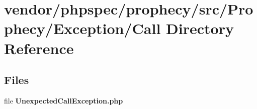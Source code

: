 \section{vendor/phpspec/prophecy/src/\+Prophecy/\+Exception/\+Call Directory Reference}
\label{dir_31c338fbad1d6237b747d48fda0be030}
\subsection*{Files}
\begin{DoxyCompactItemize}
\item 
file {\bf Unexpected\+Call\+Exception.\+php}
\end{DoxyCompactItemize}
